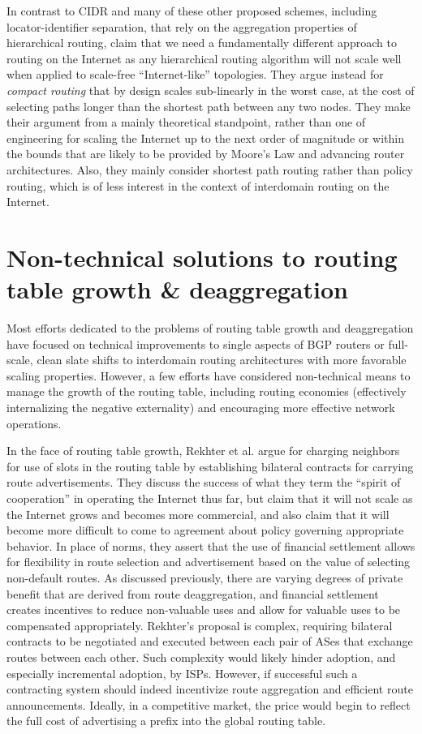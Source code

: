 In contrast to CIDR and many of these other proposed schemes, including locator-identifier separation, that rely on the aggregation properties of hierarchical routing, \cite{Krioukov:2007fk} claim that we need a fundamentally different approach to routing on the Internet as any hierarchical routing algorithm will not scale well when applied to scale-free ``Internet-like'' topologies. They argue instead for \emph{compact routing} that by design scales sub-linearly in the worst case, at the cost of selecting paths longer than the shortest path between any two nodes. They make their argument from a mainly theoretical standpoint, rather than one of engineering for scaling the Internet up to the next order of magnitude or within the bounds that are likely to be provided by Moore's Law and advancing router architectures. Also, they mainly consider shortest path routing rather than policy routing, which is of less interest in the context of interdomain routing on the Internet.

\section{Non-technical solutions to routing table growth \& deaggregation}

Most efforts dedicated to the problems of routing table growth and deaggregation have focused on technical improvements to single aspects of BGP routers or full-scale, clean slate shifts to interdomain routing architectures with more favorable scaling properties. However, a few efforts have considered non-technical means to manage the growth of the routing table, including routing economies (effectively internalizing the negative externality) and encouraging more effective network operations.

In the face of routing table growth, Rekhter et al. \cite{Rekhter:1997mi} argue for charging neighbors for use of slots in the routing table by establishing bilateral contracts for carrying route advertisements. They discuss the success of what they term the ``spirit of cooperation'' in operating the Internet thus far, but claim that it will not scale as the Internet grows and becomes more commercial, and also claim that it will become more difficult to come to agreement about policy governing appropriate behavior. In place of norms, they assert that the use of financial settlement allows for flexibility in route selection and advertisement based on the value of selecting non-default routes. As discussed previously, there are varying degrees of private benefit that are derived from route deaggregation, and financial settlement creates incentives to reduce non-valuable uses and allow for valuable uses to be compensated appropriately. Rekhter's proposal is complex, requiring bilateral contracts to be negotiated and executed between each pair of ASes that exchange routes between each other. Such complexity would likely hinder adoption, and especially incremental adoption, by ISPs. However, if successful such a contracting system should indeed incentivize route aggregation and efficient route announcements. Ideally, in a competitive market, the price would begin to reflect the full cost of advertising a prefix into the global routing table.


